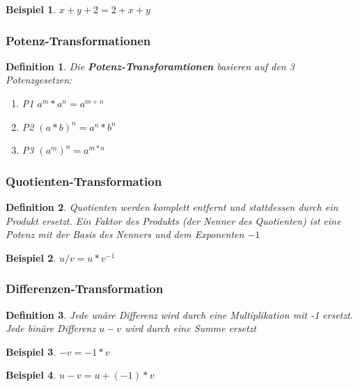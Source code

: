 \documentclass[11pt]{article}
\newtheorem{defin}{Definition}
\newtheorem{example}{Beispiel}
\begin{document}
\begin{example}
  $x+y+2 = 2+x+y$
\end{example}

\subsubsection{Potenz-Transformationen}

\begin{defin}
  \label{def:potenz_transformation}
  Die \textbf{Potenz-Transforamtionen} basieren auf den 3 Potenzgesetzen:
  \begin{enumerate}
    \item P1 $a^m * a^n = a^{m+n}$
    \item P2 $(a*b)^n   = a^n * b^n$
    \item P3 $(a^m)^n   = a^{m*n}$
  \end{enumerate}
\end{defin}

\subsubsection{Quotienten-Transformation}

\begin{defin}
  \label{def:quotienten-transformation}
  Quotienten werden komplett entfernt und stattdessen durch ein Produkt ersetzt. 
  Ein Faktor des Produkts (der Nenner des Quotienten) ist eine Potenz mit der Basis des Nenners und dem Exponenten $-1$
\end{defin}

\begin{example}
  $u/v = u * v^{-1}$
\end{example}

\subsubsection{Differenzen-Transformation}
\begin{defin}
\label{def:differenzen_transformation}
Jede unäre Differenz wird durch eine Multiplikation mit -1 ersetzt. 
Jede binäre Differenz $u-v$ wird durch eine Summe ersetzt
\end{defin}

\begin{example}
  $-v = -1 * v$
\end{example}
  
\begin{example}
  $u - v = u + (-1) * v $
\end{example}
\end{document}
